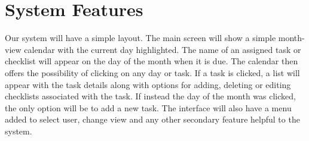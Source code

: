 \documentclass{article}
\begin{document}
\section{System Features}
Our system will have a simple layout.
The main screen will show a simple month-view calendar with the current day highlighted. 
The name of an assigned task or checklist will appear on the day of the month when it is due. 
The calendar then offers the possibility of clicking on any day or task.
If a task is clicked, a list will appear with the task details along with options for adding, deleting or editing checklists associated with the task. 
If instead the day of the month was clicked, the only option will be to add a new task. 
The interface will also have a menu added to select user, change view and any other secondary feature helpful to the system.
\end{document}
